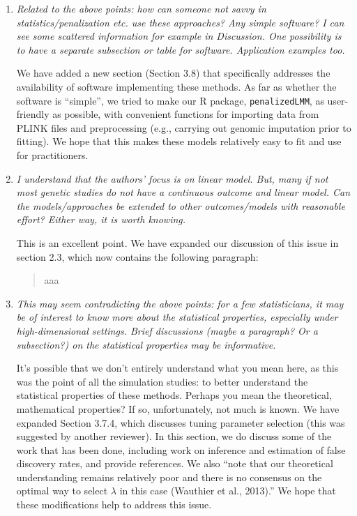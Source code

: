 \documentclass{article}
\begin{document}
\begin{enumerate}
\item \emph{Related to the above points: how can someone not savvy in statistics/penalization etc. use these approaches? Any simple software? I can see some scattered information for example in Discussion. One possibility is to have a separate subsection or table for software. Application examples too.}

  We have added a new section (Section 3.8) that specifically addresses the availability of software implementing these methods.  As far as whether the software is ``simple'', we tried to make our R package, \texttt{penalizedLMM}, as user-friendly as possible, with convenient functions for importing data from PLINK files and preprocessing (e.g., carrying out genomic imputation prior to fitting).  We hope that this makes these models relatively easy to fit and use for practitioners.

\item \emph{I understand that the authors’ focus is on linear model. But, many if not most genetic studies do not have a continuous outcome and linear model. Can the models/approaches be extended to other outcomes/models with reasonable effort? Either way, it is worth knowing.}

  This is an excellent point.  We have expanded our discussion of this issue in section 2.3, which now contains the following paragraph:

  \begin{quote}
    aaa
  \end{quote}

\item \emph{This may seem contradicting the above points: for a few statisticians, it may be of interest to know more about the statistical properties, especially under high-dimensional settings. Brief discussions (maybe a paragraph? Or a subsection?) on the statistical properties may be informative.}

  It's possible that we don't entirely understand what you mean here, as this was the point of all the simulation studies: to better understand the statistical properties of these methods.  Perhaps you mean the theoretical, mathematical properties?  If so, unfortunately, not much is known.  We have expanded Section 3.7.4, which discusses tuning parameter selection (this was suggested by another reviewer).  In this section, we do discuss some of the work that has been done, including work on inference and estimation of false discovery rates, and provide references.  We also ``note that our theoretical understanding remains relatively poor and there is no consensus on
the optimal way to select $\lambda$ in this case (Wauthier et al., 2013).''  We hope that these modifications help to address this issue.

\end{enumerate}
\end{document}
